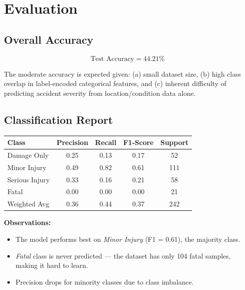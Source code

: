 \documentclass[12pt,a4paper]{article}
\begin{document}
\section{Evaluation}

\subsection{Overall Accuracy}
\[
\text{Test Accuracy} = 44.21\%
\]

The moderate accuracy is expected given: (a) small dataset size, (b) high class overlap in label-encoded categorical features, and (c) inherent difficulty of predicting accident severity from location/condition data alone.

\subsection{Classification Report}

\begin{center}
\begin{tabular}{lcccc}
\toprule
\textbf{Class} & \textbf{Precision} & \textbf{Recall} & \textbf{F1-Score} & \textbf{Support} \\
\midrule
Damage Only    & 0.25 & 0.13 & 0.17 & 52  \\
Minor Injury   & 0.49 & 0.82 & 0.61 & 111 \\
Serious Injury & 0.33 & 0.16 & 0.21 & 58  \\
Fatal          & 0.00 & 0.00 & 0.00 & 21  \\
\midrule
Weighted Avg   & 0.36 & 0.44 & 0.37 & 242 \\
\bottomrule
\end{tabular}
\end{center}

\textbf{Observations:}
\begin{itemize}[leftmargin=1.5cm]
    \item The model performs best on \textit{Minor Injury} (F1 = 0.61), the majority class.
    \item \textit{Fatal} class is never predicted — the dataset has only 104 fatal samples, making it hard to learn.
    \item Precision drops for minority classes due to class imbalance.
\end{itemize}
\end{document}
